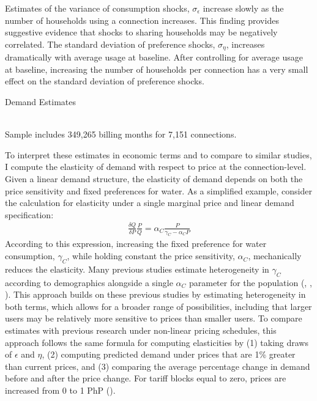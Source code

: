 \documentclass[12pt]{article}
\begin{document}
Estimates of the variance of consumption shocks, $\sigma_{\epsilon}$ increase slowly as the number of households using a connection increases.  This finding provides suggestive evidence that shocks to sharing households may be negatively correlated.  The standard deviation of preference shocks, $\sigma_{\eta}$, increases dramatically with average usage at baseline.  After controlling for average usage at baseline, increasing the number of households per connection has a very small effect on the standard deviation of preference shocks.
\begin{table}
\centering
\caption{Demand Estimates}\label{table:demandestimates}
 \\
\vspace{.2cm}
{\footnotesize{Sample includes 349,265 billing months for 7,151 connections. } }
\end{table}
To interpret these estimates in economic terms and to compare to similar studies, I compute the elasticity of demand with respect to price at the connection-level.  Given a linear demand structure, the elasticity of demand depends on both the price sensitivity and fixed preferences for water.  As a simplified example, consider the calculation for elasticity under a single marginal price and linear demand specification:
\begin{align*}
\frac{\delta Q}{\delta P} \frac{P}{Q} = \alpha_{C} \frac{P}{\gamma_{C}-\alpha_{C} P}
\end{align*}
According to this expression, increasing the fixed preference for water consumption, $\gamma_C$, while holding constant the price sensitivity, $\alpha_C$, mechanically reduces the elasticity.  Many previous studies estimate heterogeneity in $\gamma_C$ according to demographics alongside a single $\alpha_C$ parameter for the population (\cite{mcrae2014infrastructure}, \cite{olmstead2009reduced}, \cite{szabo2015value}).  This approach builds on these previous studies by estimating heterogeneity in both terms, which allows for a broader range of possibilities, including that larger users may be relatively more sensitive to prices than smaller users.  To compare estimates with previous research under non-linear pricing schedules, this approach follows the same formula for computing elasticities by (1) taking draws of $\epsilon$ and $\eta$, (2) computing predicted demand under prices that are 1\% greater than current prices, and (3) comparing the average percentage change in demand before and after the price change.  For tariff blocks equal to zero, prices are increased from 0 to 1 PhP (\cite{szabo2015value}). 
\end{document}
